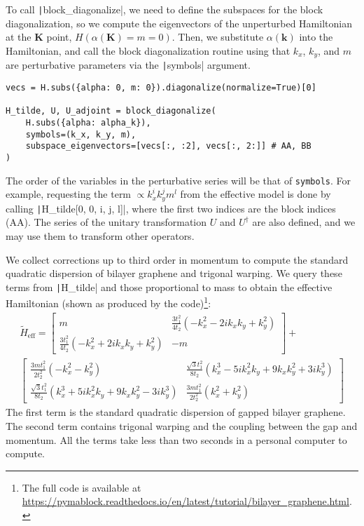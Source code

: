 To call \texttt|block_diagonalize|, we need to define the subspaces for the block diagonalization, so we compute the eigenvectors of the unperturbed Hamiltonian at the $\mathbf{K}$ point, $H(\alpha(\mathbf{K}) = m = 0)$.
Then, we substitute $\alpha(\mathbf{k})$ into the Hamiltonian, and call the block diagonalization routine using that $k_x$, $k_y$, and $m$ are perturbative parameters via the \texttt|symbols| argument.
%
\begin{verbatim}
vecs = H.subs({alpha: 0, m: 0}).diagonalize(normalize=True)[0]

H_tilde, U, U_adjoint = block_diagonalize(
    H.subs({alpha: alpha_k}),
    symbols=(k_x, k_y, m),
    subspace_eigenvectors=[vecs[:, :2], vecs[:, 2:]] # AA, BB
)
\end{verbatim}
%
The order of the variables in the perturbative series will be that of \texttt{symbols}.
For example, requesting the term $\propto k_x^{i} k_y^{j} m^{l}$ from the effective model is done by calling \texttt|H_tilde[0, 0, i, j, l]|, where the first two indices are the block indices (AA).
The series of the unitary transformation $U$ and $U^\dagger$ are also defined, and we may use them to transform other operators.

We collect corrections up to third order in momentum to compute the standard quadratic dispersion of bilayer graphene and trigonal warping.
We query these terms from \texttt|H_tilde| and those proportional to mass to obtain the effective Hamiltonian (shown as produced by the code)\footnote{The full code is available at \url{https://pymablock.readthedocs.io/en/latest/tutorial/bilayer_graphene.html}.}:
%
{\small
\begin{gather}
\tilde{H}_{\textrm{eff}} =
\begin{bmatrix}
m & \frac{3 t_1^2}{4 t_2} ( - k_x^2 - 2ik_x k_y + k_y^2) \\
\frac{3 t_1^2}{4 t_2} ( - k_x^2 + 2ik_x k_y + k_y^2) & -m
\end{bmatrix} + \nonumber \\
\begin{bmatrix}
\frac{3 m t_1^2}{2 t_2^2} ( - k_x^2 - k_y^2) & \frac{\sqrt{3} t_1^2}{8 t_2} (k_x^3 - 5ik_x^2 k_y + 9 k_x k_y^2 + 3ik_y^3) \\
\frac{\sqrt{3} t_1^2}{8 t_2} (k_x^3 + 5ik_x^2 k_y + 9 k_x k_y^2 - 3ik_y^3) & \frac{3 m t_1^2}{2 t_2^2} (k_x^2 + k_y^2)
\end{bmatrix} \nonumber
\end{gather}
}
%
The first term is the standard quadratic dispersion of gapped bilayer graphene.
The second term contains trigonal warping and the coupling between the gap and momentum.
All the terms take less than two seconds in a personal computer to compute.

